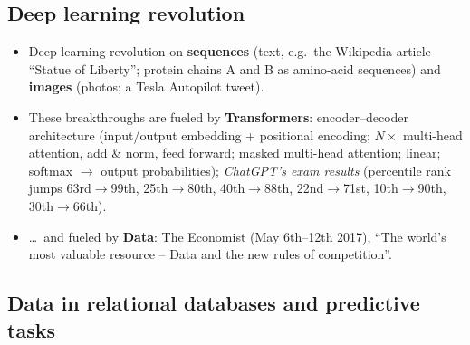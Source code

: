 \subsection{Deep learning revolution}\label{sec:lec12-revolution}

\begin{itemize}
  \item Deep learning revolution on \textbf{sequences} (text, e.g.\ the Wikipedia article
    ``Statue of Liberty''; protein chains A and B as amino-acid sequences) and
    \textbf{images} (photos; a Tesla Autopilot tweet).
  \item These breakthroughs are fueled by \textbf{Transformers}: encoder--decoder
    architecture (input/output embedding + positional encoding; $N\times$ multi-head
    attention, add \& norm, feed forward; masked multi-head attention; linear; softmax
    $\to$ output probabilities); \emph{ChatGPT's exam results} (percentile rank jumps
    63rd$\to$99th, 25th$\to$80th, 40th$\to$88th, 22nd$\to$71st, 10th$\to$90th,
    30th$\to$66th).
  \item \dots\ and fueled by \textbf{Data}: The Economist (May 6th--12th 2017), ``The
    world's most valuable resource -- Data and the new rules of competition''.
\end{itemize}

\subsection{Data in relational databases and predictive tasks}\label{sec:lec12-tasks}

